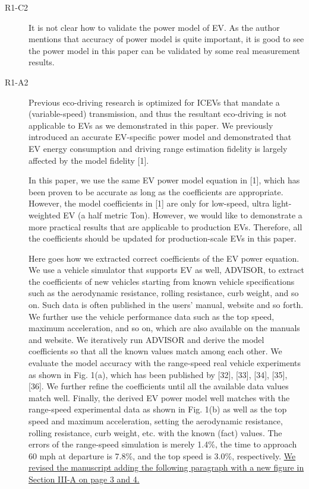 \documentclass[onecolumn]{IEEEconf}
\begin{document}
\begin{description}
\item [R1-C2] It is not clear how to validate the power model of EV. As the author mentions that accuracy of power model is quite important, it is good to see the power model in this paper can be validated by some real measurement results.

\item [R1-A2] Previous eco-driving research is optimized for ICEVs that mandate a (variable-speed) transmission, and thus the resultant eco-driving is not applicable to EVs as we demonstrated in this paper. We previously introduced an accurate EV-specific power model and demonstrated that  EV energy consumption and driving range estimation fidelity is largely affected by the model fidelity [1]. 

In this paper, we use the same EV power model equation in [1], which has been proven to be accurate as long as the coefficients are appropriate. However, the model coefficients in [1] are only for low-speed, ultra light-weighted EV (a half metric Ton). However, we would like to demonstrate a more practical results that are applicable to production EVs. Therefore, all the coefficients should be updated for production-scale EVs in this paper. 

Here goes how we extracted correct coefficients of the EV power equation. We use a vehicle simulator that supports EV as well, ADVISOR, to extract the coefficients of new vehicles starting from known vehicle specifications such as the aerodynamic resistance, rolling resistance, curb weight, and so on. Such data is often published in the users' manual, website and so forth. We further use the vehicle performance data such as the top speed, maximum acceleration, and so on, which are also available on the manuals and website. We iteratively run ADVISOR and derive the model coefficients so that all the known values match among each other. We evaluate the model accuracy with the range-speed real vehicle experiments as shown in Fig. 1(a), which has been published by [32], [33], [34], [35], [36]. We further refine the coefficients until all the available data values match well. Finally, the derived EV power model well matches with the range-speed experimental data as shown in Fig. 1(b) as well as the top speed and maximum acceleration, setting the aerodynamic resistance, rolling resistance, curb weight, etc. with the known (fact) values. The errors of the range-speed simulation is merely 1.4\%, the time to approach 60 mph at departure is 7.8\%, and the top speed is 3.0\%, respectively. \uline{We revised the manuscript adding the following paragraph with a new figure in Section III-A on page 3 and 4.} \\


\end{description}
\end{document}
